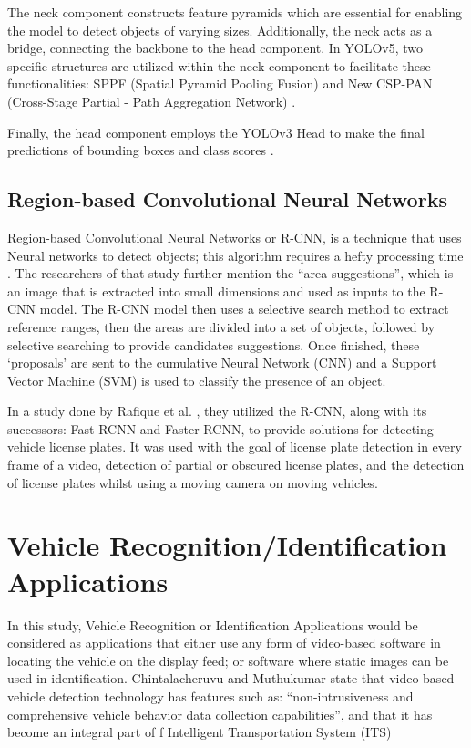 The neck component constructs feature pyramids which are essential for enabling the model to detect objects of varying sizes. Additionally, the neck acts as a bridge, connecting the backbone to the head component. In YOLOv5, two specific structures are utilized within the neck component to facilitate these functionalities: SPPF (Spatial Pyramid Pooling Fusion) and New CSP-PAN (Cross-Stage Partial - Path Aggregation Network)  \cite{Jocher_Waxmann_2023}.

Finally, the head component employs the YOLOv3 Head to make the final predictions of bounding boxes and class scores  \cite{Jocher_Waxmann_2023}.

\subsection{Region-based Convolutional Neural Networks}

Region-based Convolutional Neural Networks or R-CNN, is a technique that uses Neural networks to detect objects; this algorithm requires a hefty processing time \cite{Cuong_Trinh_Meesad_Nguyen_2022}. The researchers of that study further mention the “area suggestions”, which is an image that is extracted into small dimensions and used as inputs to the R-CNN model. The R-CNN model then uses a selective search method to extract reference ranges, then the areas are divided into a set of objects, followed by selective searching to provide candidates suggestions. Once finished, these ‘proposals’ are sent to the cumulative Neural Network (CNN)  and a Support Vector Machine (SVM) is used to classify the presence of an object.

In a study done by Rafique et al. \citeyear{Rafique_Pedrycz_Jeon_2017}, they utilized the R-CNN, along with its successors: Fast-RCNN and Faster-RCNN, to provide solutions for detecting vehicle license plates. It was used with the goal of license plate detection in every frame of a video, detection of partial or obscured license plates, and the detection of license plates whilst using a moving camera on moving vehicles.



\section{Vehicle Recognition/Identification Applications}
	
	In this study, Vehicle Recognition or Identification Applications would be considered as applications that either use any form of video-based software in locating the vehicle on the display feed; or software where static images can be used in identification. Chintalacheruvu and Muthukumar \citeyear{chintalacheruvu_2012} state that video-based vehicle detection technology has features such as: “non-intrusiveness and comprehensive vehicle behavior data collection capabilities”, and that it has become an integral part of f Intelligent Transportation System (ITS)

